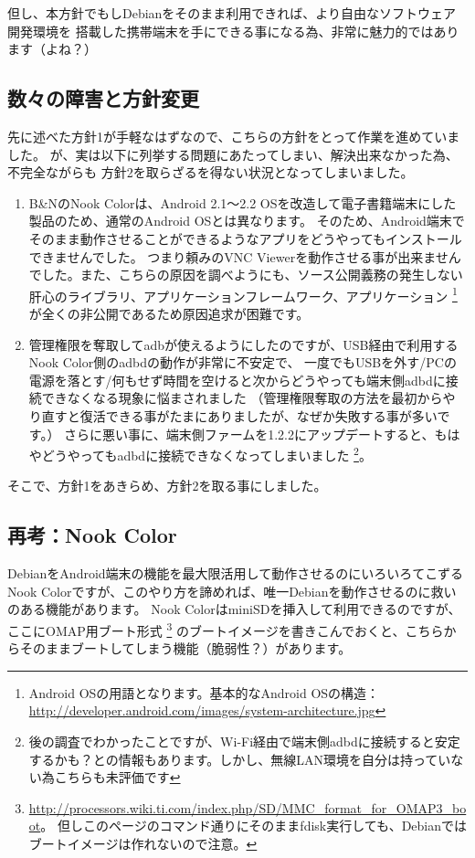 \documentclass[mingoth,a4paper]{jsarticle}
\begin{document}
但し、本方針でもしDebianをそのまま利用できれば、より自由なソフトウェア開発環境を
搭載した携帯端末を手にできる事になる為、非常に魅力的ではあります（よね？）

\subsection{数々の障害と方針変更}

先に述べた方針1が手軽なはずなので、こちらの方針をとって作業を進めていました。
が、実は以下に列挙する問題にあたってしまい、解決出来なかった為、不完全ながらも
方針2を取らざるを得ない状況となってしまいました。

\begin{enumerate}
\item B\&NのNook Colorは、Android 2.1〜2.2 OSを改造して電子書籍端末にした製品のため、通常のAndroid OSとは異なります。
そのため、Android端末でそのまま動作させることができるようなアプリをどうやってもインストールできませんでした。
つまり頼みのVNC Viewerを動作させる事が出来ませんでした。また、こちらの原因を調べようにも、ソース公開義務の発生しない
肝心のライブラリ、アプリケーションフレームワーク、アプリケーション
\footnote{Android OSの用語となります。基本的なAndroid OSの構造：\url{http://developer.android.com/images/system-architecture.jpg}}
が全くの非公開であるため原因追求が困難です。
\item 管理権限を奪取してadbが使えるようにしたのですが、USB経由で利用するNook Color側のadbdの動作が非常に不安定で、
一度でもUSBを外す/PCの電源を落とす/何もせず時間を空けると次からどうやっても端末側adbdに接続できなくなる現象に悩まされました
（管理権限奪取の方法を最初からやり直すと復活できる事がたまにありましたが、なぜか失敗する事が多いです。）
さらに悪い事に、端末側ファームを1.2.2にアップデートすると、もはやどうやってもadbdに接続できなくなってしまいました
\footnote{後の調査でわかったことですが、Wi-Fi経由で端末側adbdに接続すると安定するかも？との情報もあります。しかし、無線LAN環境を自分は持っていない為こちらも未評価です}。
\end{enumerate}

そこで、方針1をあきらめ、方針2を取る事にしました。

\subsection{再考：Nook Color}

DebianをAndroid端末の機能を最大限活用して動作させるのにいろいろてこずる
Nook Colorですが、このやり方を諦めれば、唯一Debianを動作させるのに救いのある機能があります。
Nook ColorはminiSDを挿入して利用できるのですが、ここにOMAP用ブート形式
\footnote{\url{http://processors.wiki.ti.com/index.php/SD/MMC_format_for_OMAP3_boot}。
但しこのページのコマンド通りにそのままfdisk実行しても、Debianではブートイメージは作れないので注意。}
のブートイメージを書きこんでおくと、こちらからそのままブートしてしまう機能（脆弱性？）があります。
\end{document}

